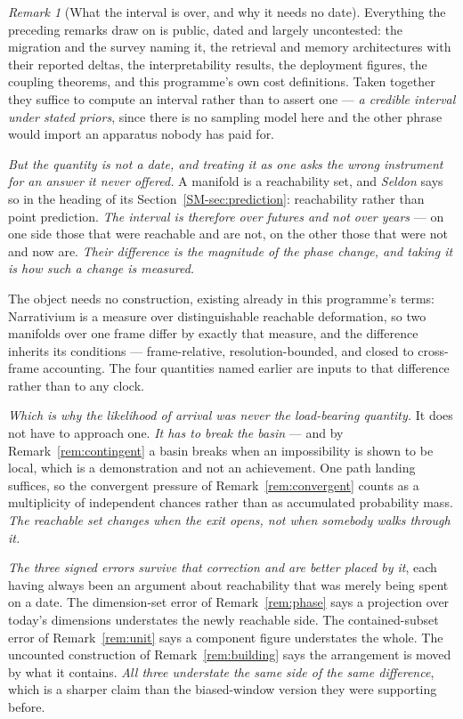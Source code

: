 \documentclass[11pt,a4paper]{article}
\theoremstyle{remark}
\newtheorem{remark}[definition]{Remark}
\begin{document}
\begin{remark}[What the interval is over, and why it needs no date]\label{rem:interval}
Everything the preceding remarks draw on is public, dated and largely uncontested: the migration and the
survey naming it, the retrieval and memory architectures with their reported deltas, the interpretability
results, the deployment figures, the coupling theorems, and this programme's own cost definitions. Taken
together they suffice to compute an interval rather than to assert one --- \emph{a credible interval
under stated priors}, since there is no sampling model here and the other phrase would import an
apparatus nobody has paid for.

\emph{But the quantity is not a date, and treating it as one asks the wrong instrument for an answer it
never offered.} A manifold is a reachability set, and \emph{Seldon} says so in the heading of its
Section~\ref{SM-sec:prediction}: reachability rather than point prediction. \emph{The interval is therefore over futures and not
over years} --- on one side those that were reachable and are not, on the other those that were not and
now are. \emph{Their difference is the magnitude of the phase change, and taking it is how such a change
is measured.}

The object needs no construction, existing already in this programme's terms: Narrativium is a measure
over distinguishable reachable deformation, so two manifolds over one frame differ by exactly that
measure, and the difference inherits its conditions --- frame-relative, resolution-bounded, and closed
to cross-frame accounting. The four quantities named earlier are inputs to that difference rather than
to any clock.

\emph{Which is why the likelihood of arrival was never the load-bearing quantity.} It does not have to
approach one. \emph{It has to break the basin} --- and by Remark~\ref{rem:contingent} a basin breaks when
an impossibility is shown to be local, which is a demonstration and not an achievement. One path landing
suffices, so the convergent pressure of Remark~\ref{rem:convergent} counts as a multiplicity of
independent chances rather than as accumulated probability mass. \emph{The reachable set changes when the
exit opens, not when somebody walks through it.}

\emph{The three signed errors survive that correction and are better placed by it}, each having always
been an argument about reachability that was merely being spent on a date. The dimension-set error of
Remark~\ref{rem:phase} says a projection over today's dimensions understates the newly reachable side.
The contained-subset error of Remark~\ref{rem:unit} says a component figure understates the whole. The
uncounted construction of Remark~\ref{rem:building} says the arrangement is moved by what it contains.
\emph{All three understate the same side of the same difference}, which is a sharper claim than the
biased-window version they were supporting before.


\end{remark}
\end{document}
